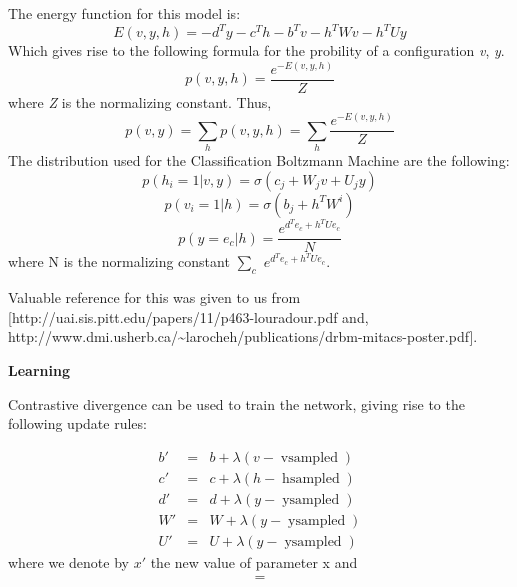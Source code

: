 \documentclass{letter}
\newcommand{\nocomma}{}
\newcommand{\noplus}{}
\newcommand{\tmop}[1]{\ensuremath{\operatorname{#1}}}
\newcommand{\tmtextbf}[1]{{\bfseries{#1}}}
\newcommand{\tmtextit}[1]{{\itshape{#1}}}
\begin{document}
The energy function for this model is:
\[ E \left( v \nocomma, y, h \right) = - d^T y - c^T h - b^T v - h^T W v - h^T
   U y \]
Which gives rise to the following formula for the probility of a configuration
\tmtextit{v}, \tmtextit{y}.
\[ p \left( v, y, h \right) = \frac{e^{- E \left( v \nocomma, y, h
   \right)}}{Z} \]
where \tmtextit{Z} is the normalizing constant. Thus,
\[ p \left( v, y \right) = \sum_h p \left( v, y, h \right) = \sum_h \frac{e^{-
   E \left( v \nocomma, y, h \right)}}{Z} \]
The distribution used for the Classification Boltzmann Machine are the
following:
\[ p \left( h_i = 1 \left| v, y \right. \right) = \sigma \left( c_j + \noplus
   \noplus W_j v \noplus + U_j y \right) \]
\[ p \left( v_i = 1 \left| h \right. \right) = \sigma \left( b_j + \noplus
   \noplus h^T W^i  \right) \]
\[ p \left( y = e_c \left| h \right. \right) = \frac{e^{d^T e_c \noplus + h^T
   Ue_c}}{N} \]
where N is the normalizing constant $\sum_c$ $e^{d^T e_c \noplus + h^T Ue_c}$.



Valuable reference for this was given to us from
[http://uai.sis.pitt.edu/papers/11/p463-louradour.pdf and,
http://www.dmi.usherb.ca/\~{ }larocheh/publications/drbm-mitacs-poster.pdf].

\tmtextbf{Learning}

Contrastive divergence can be used to train the network, giving rise to the
following update rules:


\begin{eqnarray*}
  b'  & = & b + \lambda \left( v - \tmop{vsampled} \right)\\
  c'  & = & c + \lambda \left( h - \tmop{hsampled} \right)\\
  d'  & = & d + \lambda \left( y - \tmop{ysampled} \right)\\
  W'  & = & W + \lambda \left( y - \tmop{ysampled} \right)\\
  U' & = & U + \lambda \left( y - \tmop{ysampled} \right)
\end{eqnarray*}
where we denote by $x'$ the new value of parameter x and
\begin{eqnarray*}
  & = & 
\end{eqnarray*}
\end{document}
